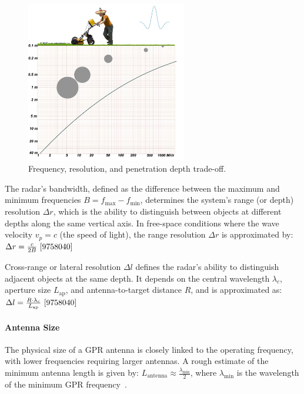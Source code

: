 \begin{figure}[H]
    \centering
    \includegraphics[width=7cm]{figs/Huirui/freq_tradeoff.png}
    \caption[Frequency, resolution, and penetration depth trade-off]{Frequency, resolution, and penetration depth trade-off\protect\footnotemark.}
    \label{fig:freq_tradeoff}
\end{figure}


The radar’s bandwidth, defined as the difference between the maximum and minimum frequencies $B = f_{\text{max}} - f_{\text{min}}$, determines the system’s range (or depth) resolution $\Delta r$, which is the ability to distinguish between objects at different depths along the same vertical axis. In free-space conditions where the wave velocity $v_p = c$ (the speed of light), the range resolution $\Delta r$ is approximated by: \(\Delta r = \frac{c}{2B}~\cite{9758040}\)

Cross-range or lateral resolution $\Delta l$ defines the radar’s ability to distinguish adjacent objects at the same depth. It depends on the central wavelength $\lambda_c$, aperture size $L_{\text{ap}}$, and antenna-to-target distance $R$, and is approximated as: \(\Delta l = \frac{R \cdot \lambda_c}{L_{\text{ap}}}~\cite{9758040}\)



\paragraph{Antenna Size}

The physical size of a \gls{GPR} antenna is closely linked to the operating frequency, with lower frequencies requiring larger antennas. A rough estimate of the minimum antenna length is given by: \(L_{\text{antenna}} \approx \frac{\lambda_{\text{min}}}{2}\), where $\lambda_{\text{min}}$ is the wavelength of the minimum \gls{GPR} frequency~\cite{burr2018design}.

